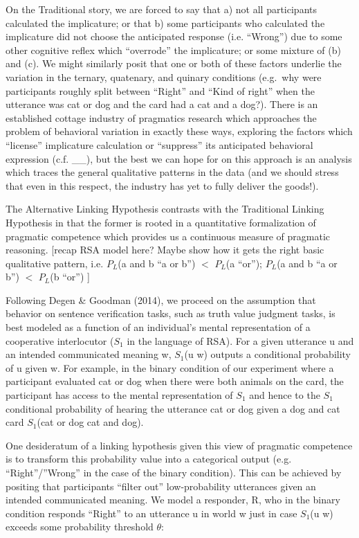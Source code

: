 \documentclass[floatsintext,man]{apa6}
\theoremstyle{definition}
\theoremstyle{definition}
\theoremstyle{definition}
\theoremstyle{remark}
\begin{document}
On the Traditional story, we are forced to say that a) not all
participants calculated the implicature; or that b) some participants
who calculated the implicature did not choose the anticipated response
(i.e. \enquote{Wrong}) due to some other cognitive reflex which
\enquote{overrode} the implicature; or some mixture of (b) and (c). We
might similarly posit that one or both of these factors underlie the
variation in the ternary, quatenary, and quinary conditions (e.g.~why
were participants roughly split between \enquote{Right} and
\enquote{Kind of right} when the utterance was cat or dog and the card
had a cat and a dog?). There is an established cottage industry of
pragmatics research which approaches the problem of behavioral variation
in exactly these ways, exploring the factors which \enquote{license}
implicature calculation or \enquote{suppress} its anticipated behavioral
expression (c.f. \_\_), but the best we can hope for on this approach is
an analysis which traces the general qualitative patterns in the data
(and we should stress that even in this respect, the industry has yet to
fully deliver the goods!).

The Alternative Linking Hypothesis contrasts with the Traditional
Linking Hypothesis in that the former is rooted in a quantitative
formalization of pragmatic competence which provides us a continuous
measure of pragmatic reasoning. {[}recap RSA model here? Maybe show how
it gets the right basic qualitative pattern, i.e. \(P_L\)(a and
b\textbar{} \enquote{a or b}) \(<\) \(P_L\)(a \textbar{} \enquote{or});
\(P_L\)(a and b\textbar{} \enquote{a or b}) \(<\) \(P_L\)(b \textbar{}
\enquote{or}) {]}

Following Degen \& Goodman (2014), we proceed on the assumption that
behavior on sentence verification tasks, such as truth value judgment
tasks, is best modeled as a function of an individual's mental
representation of a cooperative interlocutor (\(S_1\) in the language of
RSA). For a given utterance u and an intended communicated meaning w,
\(S_1\)(u \textbar{} w) outputs a conditional probability of u given w.
For example, in the binary condition of our experiment where a
participant evaluated cat or dog when there were both animals on the
card, the participant has access to the mental representation of \(S_1\)
and hence to the \(S_1\) conditional probability of hearing the
utterance cat or dog given a dog and cat card \(S_1\)(cat or dog
\textbar{} cat and dog).

One desideratum of a linking hypothesis given this view of pragmatic
competence is to transform this probability value into a categorical
output (e.g. \enquote{Right}/''Wrong'' in the case of the binary
condition). This can be achieved by positing that participants
\enquote{filter out} low-probability utterances given an intended
communicated meaning. We model a responder, R, who in the binary
condition responds \enquote{Right} to an utterance u in world w just in
case \(S_1\)(u \textbar{} w) exceeds some probability threshold
\(\theta\):
\end{document}
